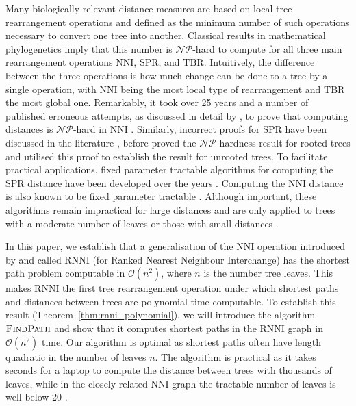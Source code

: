 \documentclass[11pt]{amsart}
\newcommand{\rnni}{\mathrm{RNNI}}
\newcommand{\findpath}{\textsc{FindPath}}
\newcommand{\nni}{\mathrm{NNI}}
\newcommand{\spr}{\mathrm{SPR}}
\newcommand{\tbr}{\mathrm{TBR}}
\newcommand{\np}{\mathcal{NP}}
\renewcommand{\O}{\mathcal O}
\begin{document}
Many biologically relevant distance measures are based on local tree rearrangement operations and defined as the minimum number of such operations necessary to convert one tree into another.
Classical results in mathematical phylogenetics imply that this number is $\np$-hard to compute \autocite{Dasgupta2000-xa, Bordewich2005-nx, Hickey2008-wv, Allen2001-ky} for all three main rearrangement operations $\nni$, $\spr$, and $\tbr$.
Intuitively, the difference between the three operations is how much change can be done to a tree by a single operation, with $\nni$ being the most local type of rearrangement and $\tbr$ the most global one.
Remarkably, it took over 25 years and a number of published erroneous attempts, as discussed in detail by \textcite{Dasgupta2000-xa}, to prove that computing distances is $\np$-hard in $\nni$ \autocite{Dasgupta2000-xa}.
Similarly, incorrect proofs for $\spr$ have been discussed in the literature \autocite{Hein1996-em, Allen2001-ky}, before \textcite{Bordewich2005-nx} proved the $\np$-hardness result for rooted trees and \textcite{Hickey2008-wv} utilised this proof to establish the result for unrooted trees.
To facilitate practical applications, fixed parameter tractable algorithms \autocite{Downey2013-nd} for computing the $\spr$ distance have been developed over the years \autocite{Whidden2010-bw, Bordewich2005-nx, Whidden2018-fw}.
Computing the $\nni$ distance is also known to be fixed parameter tractable \autocite{DasGupta1999-xf}.
Although important, these algorithms remain impractical for large distances and are only applied to trees with a moderate number of leaves or those with small distances \autocite{Whidden2018-fw}.

In this paper, we establish that a generalisation of the $\nni$ operation introduced by \textcite{Gavryushkin2018-ol} and called $\rnni$ (for Ranked Nearest Neighbour Interchange) has the shortest path problem computable in $\O(n^2)$, where $n$ is the number tree leaves.
This makes $\rnni$ the first tree rearrangement operation under which shortest paths and distances between trees are polynomial-time computable.
To establish this result (Theorem~\ref{thm:rnni_polynomial}), we will introduce the algorithm $\findpath$ and show that it computes shortest paths in the  $\rnni$ graph in $\O(n^2)$ time.
Our algorithm is optimal as shortest paths often have length quadratic in the number of leaves $n$.
The algorithm is practical as it takes seconds for a laptop to compute the distance between trees with thousands of leaves, while in the closely related $\nni$ graph the tractable number of leaves is well below 20 \autocite{Li1996-zw, Whidden2016-kl}.
\end{document}
